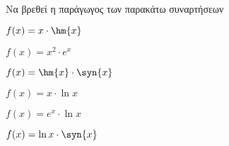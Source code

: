 Να βρεθεί η παράγωγος των παρακάτω συναρτήσεων
\begin{alist}
\item $ f(x)=x\cdot\hm{x} $
\item $ f(x)=x^2\cdot e^x $
\item $ f(x)=\hm{x}\cdot\syn{x} $
\item $ f(x)=x\cdot\ln{x} $
\item $ f(x)=e^x\cdot\ln{x} $
\item $ f(x)=\ln{x}\cdot\syn{x} $
\end{alist}
